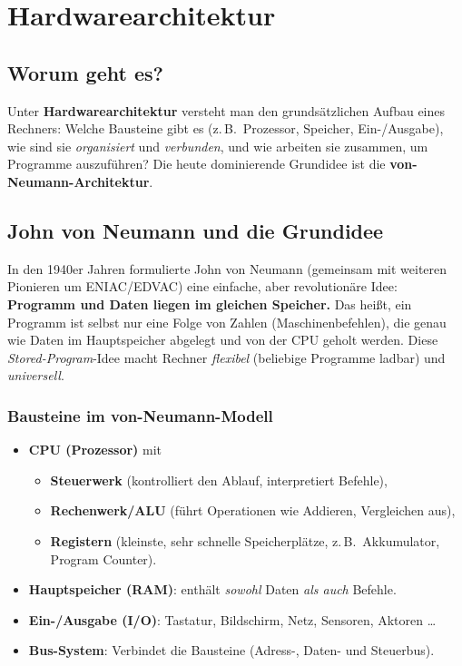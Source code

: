 \documentclass[../skript/main.tex]{subfiles}
\begin{document}
\label{chap:hardwarearchitecktur}
\chapter{Hardwarearchitektur}

\section{Worum geht es?}
Unter \textbf{Hardwarearchitektur} versteht man den grundsätzlichen Aufbau eines Rechners:
Welche Bausteine gibt es (z.\,B.\ Prozessor, Speicher, Ein-/Ausgabe), wie sind sie
\emph{organisiert} und \emph{verbunden}, und wie arbeiten sie zusammen, um Programme auszuführen?
Die heute dominierende Grundidee ist die \textbf{von-Neumann-Architektur}.

\section{John von Neumann und die Grundidee}
In den 1940er Jahren formulierte John von Neumann (gemeinsam mit weiteren Pionieren um ENIAC/EDVAC)
eine einfache, aber revolutionäre Idee: \textbf{Programm und Daten liegen im gleichen Speicher.}
Das heißt, ein Programm ist selbst nur eine Folge von Zahlen (Maschinenbefehlen), die genau wie Daten
im Hauptspeicher abgelegt und von der CPU geholt werden. Diese \emph{Stored-Program}-Idee macht
Rechner \emph{flexibel} (beliebige Programme ladbar) und \emph{universell}.

\subsection*{Bausteine im von-Neumann-Modell}
\begin{itemize}
	\item \textbf{CPU (Prozessor)} mit
	\begin{itemize}
		\item \textbf{Steuerwerk} (kontrolliert den Ablauf, interpretiert Befehle),
		\item \textbf{Rechenwerk/ALU} (führt Operationen wie Addieren, Vergleichen aus),
		\item \textbf{Registern} (kleinste, sehr schnelle Speicherplätze, z.\,B.\ Akkumulator, Program Counter).
	\end{itemize}
	\item \textbf{Hauptspeicher (RAM)}: enthält \emph{sowohl} Daten \emph{als auch} Befehle.
	\item \textbf{Ein-/Ausgabe (I/O)}: Tastatur, Bildschirm, Netz, Sensoren, Aktoren \dots
	\item \textbf{Bus-System}: Verbindet die Bausteine (Adress-, Daten- und Steuerbus).
\end{itemize}
\end{document}

